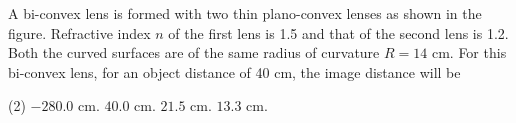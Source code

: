 
\item A bi-convex lens is formed with two thin plano-convex lenses as shown in the figure. Refractive index \( n \) of the first lens is 1.5 and that of the second lens is 1.2. Both the curved surfaces are of the same radius of curvature \( R = 14 \) cm. For this bi-convex lens, for an object distance of 40 cm, the image distance will be
    \begin{center}
    \end{center}
    \begin{tasks}(2)
        \task \( -280.0 \) cm.
        \task \( 40.0 \) cm.
        \task \( 21.5 \) cm.
        \task \( 13.3 \) cm.
    \end{tasks}

